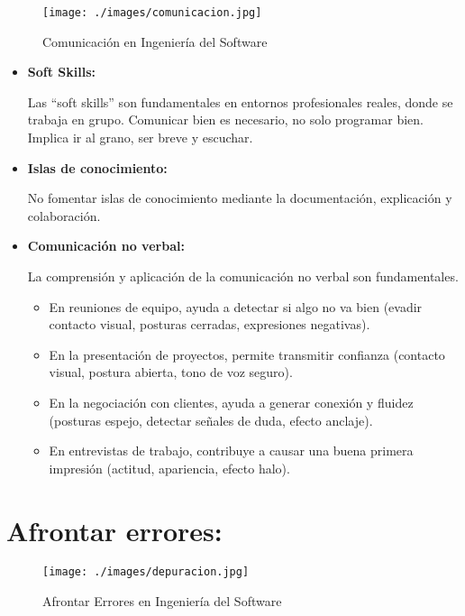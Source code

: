 \documentclass[a4paper,12pt,twoside]{article}
\begin{document}
\begin{figure}[H]
    \centering
    \texttt{[image: ./images/comunicacion.jpg]}
    \caption{Comunicación en Ingeniería del Software}
    \label{fig:comunicacion}
\end{figure}
    \begin{itemize}
        \item\textbf{Soft Skills:} 
        
        Las ``soft skills'' son fundamentales en entornos profesionales reales, donde se trabaja
        en grupo. Comunicar bien es necesario, no solo programar bien. Implica ir al grano, ser breve 
        y escuchar.
        \item\textbf{Islas de conocimiento:} 
        
        No fomentar islas de conocimiento mediante la documentación, explicación y colaboración.

        \item \textbf{Comunicación no verbal:} 
        
        La comprensión y aplicación de la comunicación no verbal son fundamentales.
        \begin{itemize}
            \item En reuniones de equipo, ayuda a detectar si algo no va bien (evadir contacto visual, 
            posturas cerradas, expresiones negativas).
            \item En la presentación de proyectos, permite transmitir confianza (contacto visual, 
            postura abierta, tono de voz seguro).
            \item En la negociación con clientes, ayuda a generar conexión y fluidez (posturas espejo, 
            detectar señales de duda, efecto anclaje).
            \item En entrevistas de trabajo, contribuye a causar una buena primera impresión (actitud, 
            apariencia, efecto halo).
        \end{itemize}
    \end{itemize}

\section{Afrontar errores:}

\begin{figure}[H]
    \centering
    \texttt{[image: ./images/depuracion.jpg]}
    \caption{Afrontar Errores en Ingeniería del Software}
    \label{fig:afrontar_errores}
\end{figure}
\end{document}
